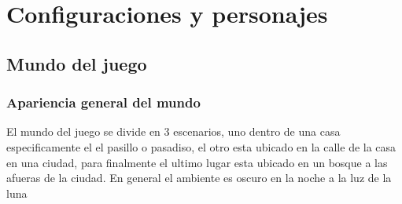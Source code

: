 \section{Configuraciones y personajes}
\subsection{Mundo del juego}
\subsubsection{Apariencia general del mundo}

El mundo del juego se divide en 3 escenarios, uno dentro de
una casa especificamente el el pasillo o pasadiso, el otro esta
ubicado en la calle de la casa en una ciudad, para finalmente
el ultimo lugar esta ubicado en un bosque a las afueras de la
ciudad. En general el ambiente es oscuro en la noche a la luz de la luna

